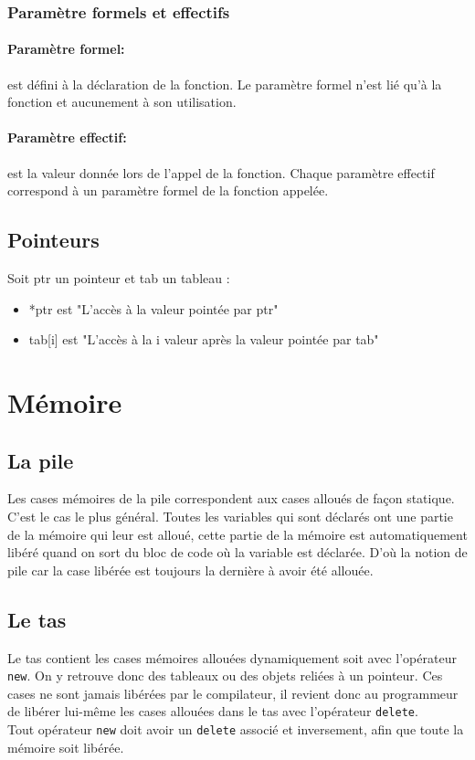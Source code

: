 \documentclass[10pt,a4paper,twoside]{article}
\begin{document}
\subsubsection{Paramètre formels et effectifs}
\paragraph{Paramètre formel:} est défini à la déclaration de la fonction. Le paramètre formel n'est lié qu'à la fonction et aucunement à son utilisation.

\paragraph{Paramètre effectif:} est la valeur donnée lors de l'appel de la fonction. Chaque paramètre effectif correspond à un paramètre formel de la fonction appelée.

\subsection{Pointeurs}
Soit ptr un pointeur et tab un tableau :
\begin{itemize}
\item *ptr est "L’accès à la valeur pointée par ptr"
\item tab[i] est "L'accès à la i valeur après la valeur pointée par tab" 
\end{itemize}

\section{Mémoire}
\subsection{La pile}
Les cases mémoires de la pile correspondent aux cases alloués de façon statique. C'est le cas le plus général. Toutes les variables qui sont déclarés ont une partie de la mémoire qui leur est alloué, cette partie de la mémoire est automatiquement libéré quand on sort du bloc de code où la variable est déclarée. D'où la notion de pile car la case libérée est toujours la dernière à avoir été allouée.

\subsection{Le tas}
Le tas contient les cases mémoires allouées dynamiquement soit avec l'opérateur \verb=new=. On y retrouve donc des tableaux ou des objets reliées à un pointeur. Ces cases ne sont jamais libérées par le compilateur, il revient donc au programmeur de libérer lui-même les cases allouées dans le tas avec l'opérateur \verb=delete=.\\
Tout opérateur \verb=new= doit avoir un \verb=delete= associé et inversement, afin que toute la mémoire soit libérée.
\end{document}
